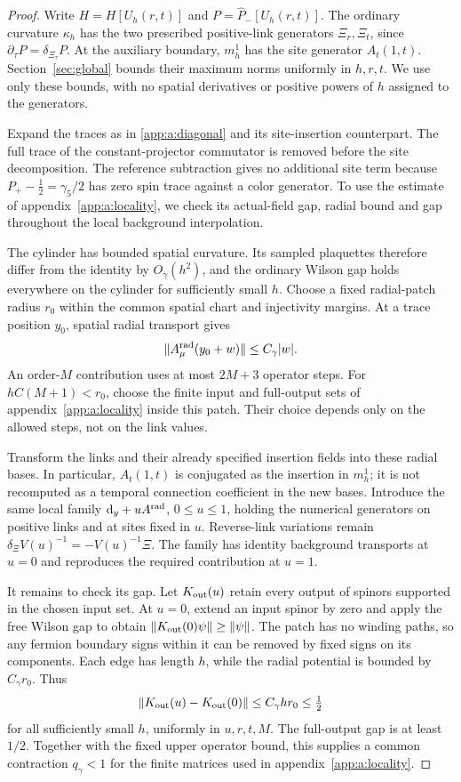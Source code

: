 \documentclass[11pt,a4paper]{article}
\theoremstyle{remark}
\newcommand{\dd}{\mathrm d}
\begin{document}
\begin{proof}
Write $H=H[U_h(r,t)]$ and $P=\widehat P_-[U_h(r,t)]$.
The ordinary curvature $\kappa_h$ has the two prescribed positive-link
generators $\Xi_r,\Xi_t$, since
$\partial_\tau P=\delta_{\Xi_\tau}P$. At the auxiliary boundary,
$m_h^1$ has the site generator $A_t(1,t)$.
Section~\ref{sec:global} bounds their maximum norms uniformly in
$h,r,t$. We use only these bounds, with no spatial derivatives or
positive powers of $h$ assigned to the generators.

Expand the traces as in \eqref{app:a:diagonal} and its site-insertion
counterpart. The full trace of the constant-projector commutator is
removed before the site decomposition. The reference subtraction gives
no additional site term because $P_+-\tfrac12=\gamma_5/2$ has zero
spin trace against a color generator. To use the estimate of
appendix~\ref{app:a:locality}, we check its actual-field gap, radial
bound and gap throughout the local background interpolation.

The cylinder has bounded spatial curvature. Its sampled plaquettes
therefore differ from the identity by $O_\gamma(h^2)$, and the ordinary
Wilson gap holds everywhere on the cylinder for sufficiently small $h$.
Choose a fixed radial-patch radius $r_0$ within the common spatial chart
and injectivity margins. At a trace position $y_0$, spatial radial
transport gives
\begin{equation}
 \|A^{\rm rad}_\mu(y_0+w)\|\le C_\gamma|w|.
\end{equation}
An order-$M$ contribution uses at most $2M+3$ operator steps.
For $hC(M+1)<r_0$, choose the finite input and full-output sets of
appendix~\ref{app:a:locality} inside this patch. Their choice depends
only on the allowed steps, not on the link values.

Transform the links and their already specified insertion fields into
these radial bases. In particular, $A_t(1,t)$ is conjugated as the insertion
in $m_h^1$; it is not recomputed as a temporal connection coefficient
in the new bases. Introduce the same local family
$\dd_y+uA^{\rm rad}$, $0\le u\le1$, holding the numerical generators
on positive links and at sites fixed in $u$. Reverse-link variations
remain $\delta_\Xi V(u)^{-1}=-V(u)^{-1}\Xi$.
The family has identity background transports at $u=0$ and reproduces
the required contribution at $u=1$.

It remains to check its gap. Let $K_{\rm out}(u)$ retain every output
of spinors supported in the chosen input set. At $u=0$, extend an input
spinor by zero and apply the free Wilson gap to obtain
$\|K_{\rm out}(0)\psi\|\ge\|\psi\|$. The patch has no winding
paths, so any fermion boundary signs within it can be removed by fixed
signs on its components. Each edge has length $h$, while the radial
potential is bounded by $C_\gamma r_0$. Thus
\begin{equation}
 \|K_{\rm out}(u)-K_{\rm out}(0)\|
 \le C_\gamma h r_0\le\tfrac12
\end{equation}
for all sufficiently small $h$, uniformly in $u,r,t,M$. The full-output
gap is at least $1/2$. Together with the fixed upper operator bound,
this supplies a common contraction $q_\gamma<1$ for the finite matrices
used in appendix~\ref{app:a:locality}.


\end{proof}
\end{document}
